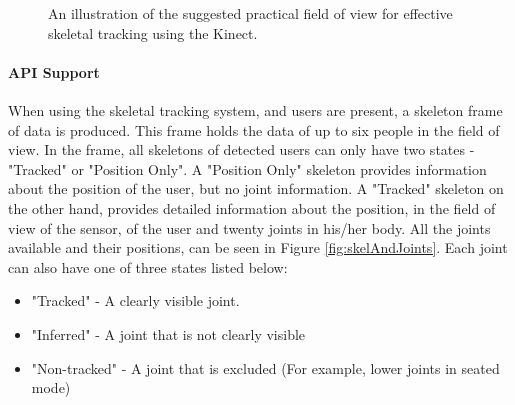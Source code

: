 \begin{figure}[ht]
	\centering
	{%
		\setlength{\fboxsep}{0pt}%
		\setlength{\fboxrule}{0.5pt}%
		}
	\caption{An illustration of the suggested practical field of view for effective skeletal tracking using the Kinect. \cite{msdnSkelTrack2017}}
	\label{fig:skelTrackFieldView}
\end{figure}

\paragraph{API Support}
When using the skeletal tracking system, and users are present, a skeleton frame of data is produced. This frame holds the data of up to six people in the field of view. In the frame, all skeletons of detected users can only have two states - "Tracked" or "Position Only". A "Position Only" skeleton provides information about the position of the user, but no joint information. A "Tracked" skeleton on the other hand, provides detailed information about the position, in the field of view of the sensor, of the user and twenty joints in his/her body. \cite{msdnTrackUserSkel2017} All the joints available and their positions, can be seen in Figure \ref{fig:skelAndJoints}. Each joint can also have one of three states listed below:

\begin{itemize}
	\item "Tracked" - A clearly visible joint.
	\item "Inferred" - A joint that is not clearly visible
	\item "Non-tracked" - A joint that is excluded (For example, lower joints in seated mode)
\end{itemize}


